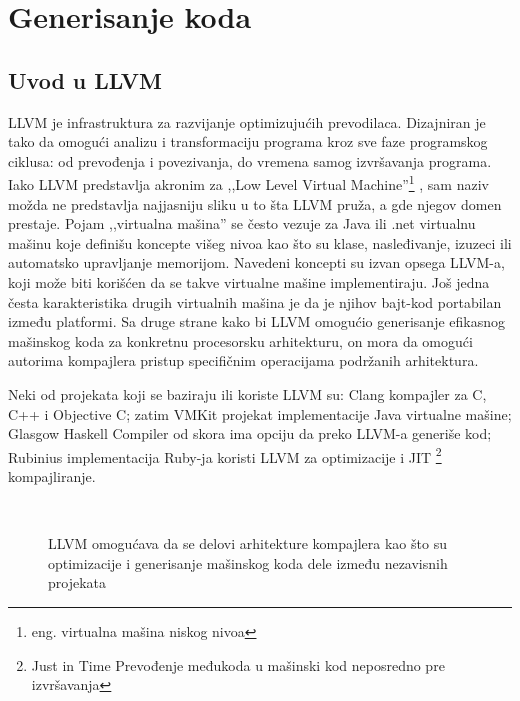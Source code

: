 \chapter{Generisanje koda}
\label{ch:generisanje} 
\section{Uvod u LLVM}

LLVM je infrastruktura za razvijanje optimizujućih prevodilaca. Dizajniran je tako da omogući analizu i transformaciju programa kroz sve faze programskog ciklusa: od prevođenja i povezivanja, do vremena samog izvršavanja programa\cite{llvm-cgo04}. 
Iako LLVM predstavlja akronim za ,,Low Level Virtual Machine''\footnote{eng. virtualna mašina niskog nivoa}
, sam naziv možda ne predstavlja najjasniju sliku u to šta LLVM pruža, a gde njegov domen prestaje. 
Pojam ,,virtualna mašina'' se često vezuje za Java ili .net virtualnu mašinu koje definišu koncepte višeg nivoa kao što su klase, nasleđivanje, izuzeci ili automatsko upravljanje memorijom. 
Navedeni koncepti su izvan opsega LLVM-a, koji može biti korišćen da se takve virtualne mašine implementiraju. 
Još jedna česta karakteristika drugih virtualnih mašina je da je njihov bajt-kod portabilan između platformi. 
Sa druge strane kako bi LLVM omogućio generisanje efikasnog mašinskog koda za konkretnu procesorsku arhitekturu, on mora da omogući autorima kompajlera pristup specifičnim operacijama podržanih arhitektura. 

Neki od projekata koji se baziraju ili koriste LLVM su: Clang \ndash kompajler za C, C++ i Objective C; 
zatim VMKit projekat implementacije Java virtualne mašine; 
Glasgow Haskell Compiler od skora ima opciju da preko LLVM-a generiše kod; 
Rubinius implementacija Ruby-ja koristi LLVM za optimizacije i JIT
\footnote{\skr \eng Just in Time \ndash Prevođenje međukoda u mašinski kod neposredno pre izvršavanja} 
kompajliranje.

\begin{figure}[h]

\centering
{} \\

\caption{LLVM omogućava da se delovi arhitekture kompajlera kao što su optimizacije i generisanje mašinskog koda dele između nezavisnih projekata}
\end{figure}

